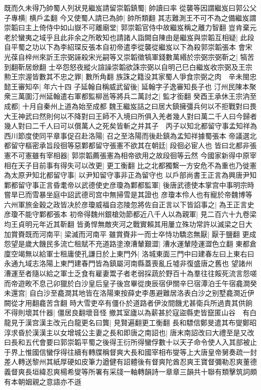 既而久未得乃帥蜀人列狀見繼岌請留崇韜鎮蜀|{
	帥讀曰率}
從襲等因謂繼岌曰郭公父子專横|{
	横戶孟翻}
今又使蜀人請已為帥|{
	帥所類翻}
其志難測王不可不為之備繼岌謂崇韜曰主上倚侍中如山嶽不可離廟堂|{
	郭崇韜官侍中故繼岌稱之離力智翻}
豈肯棄元老於蠻夷之域乎且此非余之所敢知也請諸人詣闕自陳由是繼岌與崇韜互相疑|{
	此段自平蜀之功以下為李紹琛反張本自初帝遣李從襲從繼岌以下為殺郭崇韜張本}
會宋光葆自梓州來訢王宗弼誣殺宋光嗣等又崇韜徵犒軍錢數萬緡於宗弼宗弼靳之|{
	犒苦到翻靳居焮翻}
士卒怨怒夜縱火諠譟崇韜欲誅宗弼以自明己巳白繼岌收宗弼及王宗勲王宗渥皆數其不忠之罪|{
	數所角翻}
族誅之籍没其家蜀人爭食宗弼之肉　辛未閩忠懿王審知卒|{
	年六十四}
子延翰自稱威武留後|{
	延翰字子逸審知長子也}
汀州民陳本聚衆三萬圍汀州延翰遣右軍都監柳邕等將兵二萬討之|{
	監才銜翻}
癸酉王承休王宗汭至成都|{
	十月自秦州上道為始至成都}
魏王繼岌詰之曰居大鎮擁彊兵何以不拒戰對曰畏大王神武曰然則何以不降對曰王師不入境曰所俱入羌者幾人對曰萬二千人曰今歸者幾人對曰二千人曰可以償萬人之死矣皆斬之并其子　丙子以知北都留守事孟知祥為西川節度使同平章事促召赴洛陽|{
	召之至洛陽而後赴鎮為孟知祥據蜀張本}
帝議選北都留守樞密承旨段徊等惡鄴都留守張憲不欲其在朝廷|{
	段徊必宦人也}
皆曰北都非張憲不可憲雖有宰相器|{
	郭崇韜薦張憲為相帝欲用之故段徊等云然}
今國家新得中原宰相在天子目前事有得失可以改更|{
	更工衡翻}
比之北都獨繫一方安危不為重也乃徙憲為太原尹知北都留守事|{
	以尹知留守事非正為留守也}
以戶部尚書王正言為興唐尹知鄴都留守事正言昏耄帝以武德使史彦瓊為鄴都監軍|{
	後唐武德使本掌宫中事明宗時嘗旱已而雪暴坐庭中詔武德司宫中無掃雪是其證也}
彦瓊本伶人也有寵於帝魏博等六州軍旅金穀之政皆决於彦瓊威福自恣陵忽將佐自正言以下皆諂事之|{
	為王正言史彦瓊不能守鄴都張本}
初帝得魏州銀槍効節都近八千人以為親軍|{
	見二百六十九卷梁均王貞明元年近其靳翻}
皆勇悍無敵夾河之戰實賴其用屢立殊功常許以滅梁之日大加賞賚既而河南平|{
	梁滅而河南平}
雖賞賚非一而士卒恃功驕恣無厭|{
	厭于鹽翻}
更成怨望是歲大饑民多流亡租賦不充道路塗潦漕輦艱澀|{
	漕水運輦陸運澀色立翻}
東都倉廩空竭無以給軍士租庸使孔謙日於上東門外|{
	洛城東面三門中曰建春左曰上東右曰永通九域志洛陽上東門建春門皆為鎮屬河南縣蓋喪亂丘墟非復盛唐之舊也}
望諸州漕運至者隨以給之軍士乏食有雇妻鬻子者老弱採蔬於野百十為羣往往餒死流言怨嗟而帝遊畋不息己卯獵於白沙皇后皇子後宫畢從庚辰宿伊關辛巳宿潭泊壬午宿龕澗癸未還宫|{
	自白沙至龕澗其地皆在洛陽東按薛史李愚避難居洛表白沙之别墅龕澗近伊闕從才用翻龕苦含翻}
時大雪吏卒有僵仆於道路者伊汝間饑尤甚衛兵所過責其供餉不得則壞其什器|{
	僵居良翻壞音怪}
撤其室廬以為薪甚於寇盜縣吏皆竄匿山谷　有白龍見于漢宫漢主改元白龍更名曰龔|{
	見賢遍翻更工衡翻}
長和驃信鄭旻遣其布燮鄭昭淳求昏於漢漢主以女增城公主妻之長和即唐之南詔也|{
	唐末南詔改曰大禮至是又改曰長和五代會要曰郭崇韜平蜀之後得王衍所得蠻俘數十以天子命令使人入其部被止于界上惟國信蠻俘得往續有轉牒稱督爽大長和國宰相布燮等上大唐皇帝舅奏疏一封差人轉送黎州其紙厚硬如皮筆力遒健有詔體後有督爽陀酋忍爽王寶督彌勒忍爽董德義督爽長垣緯忍爽楊希燮等所署有采牋一軸轉韻詩一章章三韻共十聯有類擊筑詞頗有本朝姻親之意語亦不遜}
